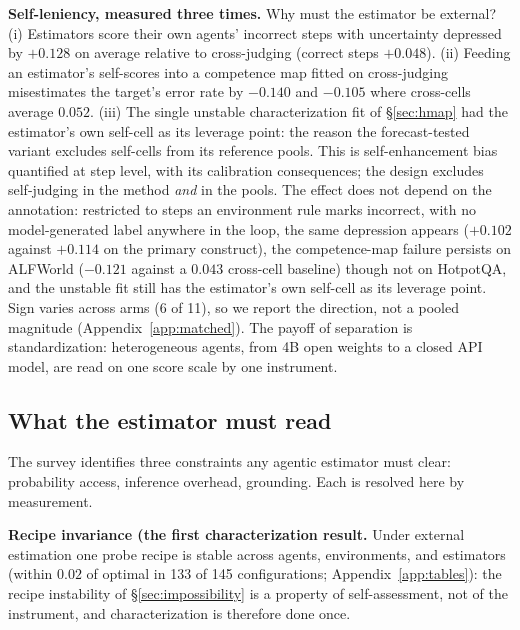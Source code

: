 \documentclass{article}
\begin{document}
\textbf{Self-leniency, measured three times.} Why must the estimator be
external? (i) Estimators score their own agents' incorrect steps with
uncertainty depressed by $+0.128$ on average relative to cross-judging
(correct steps $+0.048$). (ii) Feeding an estimator's self-scores into a
competence map fitted on cross-judging misestimates the target's error rate by
$-0.140$ and $-0.105$ where cross-cells average $0.052$. (iii) The single
unstable characterization fit of \S\ref{sec:hmap} had the estimator's own
self-cell as its leverage point: the reason the forecast-tested variant
excludes self-cells from its reference pools. This is self-enhancement bias
\citep{zheng2023judging} quantified at step level, with its calibration
consequences; the design excludes self-judging in the method \emph{and} in the
pools. The effect does not depend on the annotation: restricted to steps an
environment rule marks incorrect, with no model-generated label anywhere in
the loop, the same depression appears ($+0.102$ against $+0.114$ on the
primary construct), the competence-map failure persists on ALFWorld
($-0.121$ against a $0.043$ cross-cell baseline) though not on HotpotQA, and
the unstable fit still has the estimator's own self-cell as its leverage
point. Sign varies across arms (6 of 11), so we report the direction, not a
pooled magnitude (Appendix~\ref{app:matched}).  The payoff of separation is standardization: heterogeneous agents, from
4B open weights to a closed API model, are read on one score scale by one
instrument.


\subsection{What the estimator must read}\label{sec:instrument}
The survey identifies three constraints any agentic estimator must clear: probability access, inference overhead, grounding. Each is resolved here by
measurement.

\textbf{Recipe invariance (the first characterization result.} Under external estimation one probe recipe is stable across agents,
environments, and estimators (within $0.02$ of optimal in 133 of 145
configurations; Appendix~\ref{app:tables}): the recipe instability of
\S\ref{sec:impossibility} is a property of self-assessment, not of the
instrument, and characterization is therefore done once.
\end{document}
